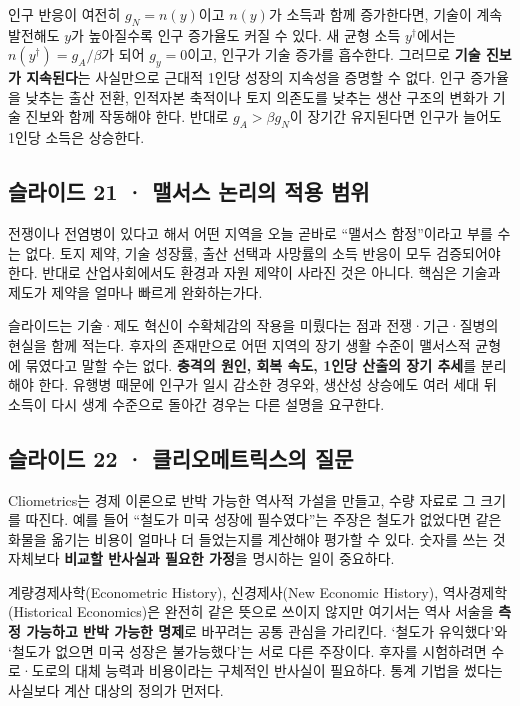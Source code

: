 \documentclass[10pt,a4paper]{article}
\begin{document}
인구 반응이 여전히 $g_N=n(y)$이고 $n(y)$가 소득과 함께 증가한다면, 기술이 계속 발전해도 $y$가 높아질수록 인구 증가율도 커질 수 있다. 새 균형 소득 $y^\dagger$에서는 $n(y^\dagger)=g_A/\beta$가 되어 $g_y=0$이고, 인구가 기술 증가를 흡수한다. 그러므로 \textbf{기술 진보가 지속된다}는 사실만으로 근대적 1인당 성장의 지속성을 증명할 수 없다. 인구 증가율을 낮추는 출산 전환, 인적자본 축적이나 토지 의존도를 낮추는 생산 구조의 변화가 기술 진보와 함께 작동해야 한다. 반대로 $g_A>\beta g_N$이 장기간 유지된다면 인구가 늘어도 1인당 소득은 상승한다.\par

\subsection{슬라이드 21 · 맬서스 논리의 적용 범위}
전쟁이나 전염병이 있다고 해서 어떤 지역을 오늘 곧바로 “맬서스 함정”이라고 부를 수는 없다. 토지 제약, 기술 성장률, 출산 선택과 사망률의 소득 반응이 모두 검증되어야 한다. 반대로 산업사회에서도 환경과 자원 제약이 사라진 것은 아니다. 핵심은 기술과 제도가 제약을 얼마나 빠르게 완화하는가다.\par

슬라이드는 기술·제도 혁신이 수확체감의 작용을 미뤘다는 점과 전쟁·기근·질병의 현실을 함께 적는다. 후자의 존재만으로 어떤 지역의 장기 생활 수준이 맬서스적 균형에 묶였다고 말할 수는 없다. \textbf{충격의 원인, 회복 속도, 1인당 산출의 장기 추세}를 분리해야 한다. 유행병 때문에 인구가 일시 감소한 경우와, 생산성 상승에도 여러 세대 뒤 소득이 다시 생계 수준으로 돌아간 경우는 다른 설명을 요구한다.\par

\subsection{슬라이드 22 · 클리오메트릭스의 질문}
Cliometrics는 경제 이론으로 반박 가능한 역사적 가설을 만들고, 수량 자료로 그 크기를 따진다. 예를 들어 “철도가 미국 성장에 필수였다”는 주장은 철도가 없었다면 같은 화물을 옮기는 비용이 얼마나 더 들었는지를 계산해야 평가할 수 있다. 숫자를 쓰는 것 자체보다 \textbf{비교할 반사실과 필요한 가정}을 명시하는 일이 중요하다.\par

계량경제사학(Econometric History), 신경제사(New Economic History), 역사경제학(Historical Economics)은 완전히 같은 뜻으로 쓰이지 않지만 여기서는 역사 서술을 \textbf{측정 가능하고 반박 가능한 명제}로 바꾸려는 공통 관심을 가리킨다. ‘철도가 유익했다’와 ‘철도가 없으면 미국 성장은 불가능했다’는 서로 다른 주장이다. 후자를 시험하려면 수로·도로의 대체 능력과 비용이라는 구체적인 반사실이 필요하다. 통계 기법을 썼다는 사실보다 계산 대상의 정의가 먼저다.\par
\end{document}
